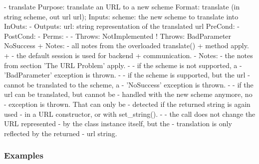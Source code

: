 \begin{myspec}
    - translate
      Purpose:  translate an URL to a new scheme
      Format:   translate            (in  string scheme,
                                      out url    url);
      Inputs:   scheme:               the new scheme to
                                      translate into
      InOuts:   -
      Outputs:  url:                  string representation of
                                      the translated url
      PreCond:  -
      PostCond: -
      Perms:    -
-     Throws:   NotImplemented
!     Throws:   BadParameter
                NoSuccess
+     Notes:    - all notes from the overloaded translate() 
+                 method apply.
+               - the default session is used for backend
+                 communication.
-     Notes:    - the notes from section 'The URL Problem' apply.
-               - if the scheme is not supported,  a
-                 'BadParameter' exception is thrown.
-               - if the scheme is supported, but the url
-                 cannot be translated to the scheme, a
-                 'NoSuccess' exception is thrown.
-               - if the url can be translated, but cannot be
-                 handled with the new scheme anymore, no
-                 exception is thrown.  That can only be
-                 detected if the returned string is again used
-                 in a URL constructor, or with set_string().
-               - the call does not change the URL represented
-                 by the class instance itself, but the
-                 translation is only reflected by the returned
-                 url string.
 \end{myspec}
 
 
 \subsubsection{Examples}
 
